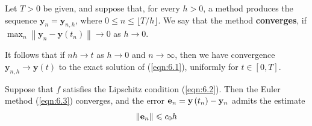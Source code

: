\documentclass[a4paper]{article}
\begin{document}
\begin{definition}
    Let $T>0$ be given, and suppose that, for every $h>0$, a method produces the sequence $\mathbf{y}_n=\mathbf{y}_{n, h}$, where $0 \leq n \leq\lfloor T / h\rfloor$. We say that the method \textbf{converges}, if $\max _{n}\left\|\mathbf{y}_n-\mathbf{y}\left(t_n\right)\right\| \rightarrow 0$ as $h \rightarrow 0$. 
\end{definition}

It follows that if $n h \rightarrow t$ as $h \rightarrow 0$ and $n \rightarrow \infty$, then we have convergence $\mathbf{y}_{n, h} \rightarrow \mathbf{y}(t)$ to the exact solution of (\ref{eqn:6.1}), uniformly for $t \in[0, T]$.

\begin{theorem}
    Suppose that $f$ satisfies the Lipschitz condition (\ref{eqn:6.2}). Then the Euler method (\ref{eqn:6.3}) converges, and the error $\mathbf{e}_n=\mathbf{y}\left(t_n\right)-{\bf y}_n$ admits the estimate
\begin{equation}\label{eqn:6.4}
    \left\|{\bf e}_n\right\| \leqslant c_0 h
\end{equation}
\end{theorem}
\end{document}
